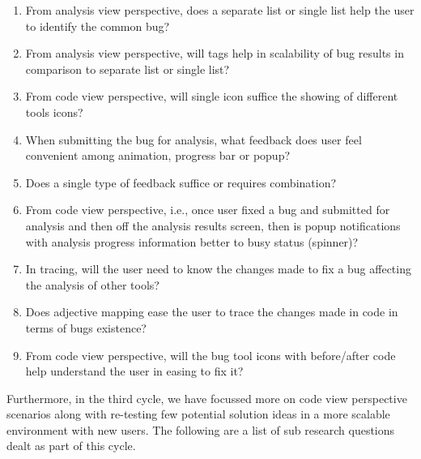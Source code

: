 \begin{enumerate}
	\item From analysis view perspective, does a separate list or single list help the user to identify the common bug?
	\item From analysis view perspective, will tags help in scalability of bug results in comparison to separate list or single list?
	\item From code view perspective, will single icon suffice the showing of different tools icons?
	\item When submitting the bug for analysis, what feedback does user feel convenient among animation, progress bar or popup?
	\item Does a single type of feedback suffice or requires combination?
	\item From code view perspective, i.e., once user fixed a bug and submitted for analysis and then off the analysis results screen, then is popup notifications with analysis progress information better to busy status (spinner)?
	\item In tracing, will the user need to know the changes made to fix a bug affecting the analysis of other tools?
	\item Does adjective mapping ease the user to trace the changes made in code in terms of bugs existence?
	\item From code view perspective, will the bug tool icons with before/after code help understand the user in easing to fix it? \\
\end{enumerate} 


Furthermore, in the third cycle, we have focussed more on code view perspective scenarios along with re-testing few potential solution ideas in a more scalable environment with new users. The following are a list of sub research questions dealt as part of this cycle. \\ \\

